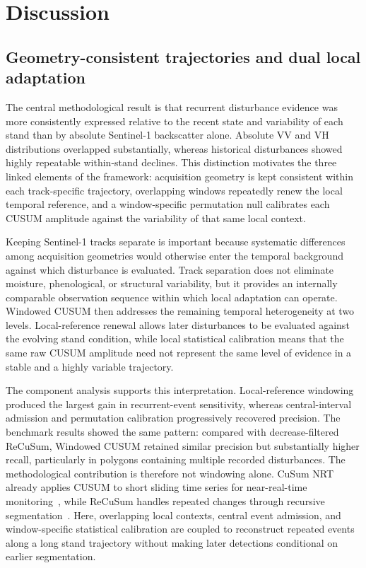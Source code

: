 \section{Discussion}
\label{sec:discussion}


\subsection{Geometry-consistent trajectories and dual local adaptation}

The central methodological result is that recurrent disturbance evidence was more consistently expressed relative to the recent state and variability of each stand than by absolute Sentinel-1 backscatter alone. Absolute VV and VH distributions overlapped substantially, whereas historical disturbances showed highly repeatable within-stand declines. This distinction motivates the three linked elements of the framework: acquisition geometry is kept consistent within each track-specific trajectory, overlapping windows repeatedly renew the local temporal reference, and a window-specific permutation null calibrates each CUSUM amplitude against the variability of that same local context.

Keeping Sentinel-1 tracks separate is important because systematic differences among acquisition geometries would otherwise enter the temporal background against which disturbance is evaluated. Track separation does not eliminate moisture, phenological, or structural variability, but it provides an internally comparable observation sequence within which local adaptation can operate. Windowed CUSUM then addresses the remaining temporal heterogeneity at two levels. Local-reference renewal allows later disturbances to be evaluated against the evolving stand condition, while local statistical calibration means that the same raw CUSUM amplitude need not represent the same level of evidence in a stable and a highly variable trajectory.

The component analysis supports this interpretation. Local-reference windowing produced the largest gain in recurrent-event sensitivity, whereas central-interval admission and permutation calibration progressively recovered precision. The benchmark results showed the same pattern: compared with decrease-filtered ReCuSum, Windowed CUSUM retained similar precision but substantially higher recall, particularly in polygons containing multiple recorded disturbances. The methodological contribution is therefore not windowing alone. CuSum NRT already applies CUSUM to short sliding time series for near-real-time monitoring~\citep{Ygorra2024CuSumNRT}, while ReCuSum handles repeated changes through recursive segmentation~\citep{Ygorra2023ReCuSum}. Here, overlapping local contexts, central event admission, and window-specific statistical calibration are coupled to reconstruct repeated events along a long stand trajectory without making later detections conditional on earlier segmentation.

